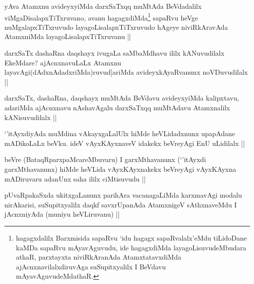 \begin{artha}
yAva Atamxnu avideyxyiMda darxSaTxqq muMtAda BeVdadalilx viMgaDisalapxTiTxruvano, avanu hagagxdiMda\footnote{hagagxdalilx Barxmisida sapaRvu `idu hagagx sapaRvalalx'eMdu tiLidoDane kaMDa sapaRvu mAyavAguvudu, ide hagagxdiMda layagoLisuvudeMbudara athaR, parxtayxta niviRkAranAda AtamxtatavxdiMda ajAcnxnavilalxdiruvAga suSupitxyalilx I BeVdavu mAyavAguvudeMdathaR.} sapaRvu heVge nuMgalapxTiTxruvudo layagoLisalapxTiTxruvudo hAgeye niviRkAravAda AtamxniMda layagoLisalapxTiTxruvanu ||
\end{artha}

\begin{artha}
darxSaTx dashaRna daqshayx ivugaLa saMbaMdhavu ililx kANuvudilalx EkeMdare? ajAcnxnavuLaLx Atamxnu layavAgi(dAdxnAdadxriMda)ruvud]ariMda avideyxkAyaRvanunx noVDuvudilalx ||
\end{artha}

\begin{artha}
darxSaTx, dashaRna, daqshayx muMtAda BeVdavu avideyxyiMda kalipxtavu, adariMda ajAcnxnavu nAshavAgalu darxSaTxqq muMtAdavu Atamxnalilx kANisuvudilalx ||
\end{artha}

\begin{artha}
`\stext'itAyxdiyAda muMdina vAkayxgaLalUlx hiMde heVLidadxnunx upapAdane mADikoLaLx beVku. ideV vAyxKAyxnaveV idakekx beVreyAgi EnU uLidilalx ||
\end{artha}



\begin{artha}
beVre (BataqRparxpaMcareMbuvaru) I garxMthavanunx (`\stext'itAyxdi garxMthavanunx) hiMde heVLida vAyxKAyxnakekx beVreyAgi vAyxKAyxna mADiruvaru adanUnx saha ililx ciMtisuvudu ||
\end{artha}


\begin{artha}
pUvaRpakaSxda ukitxgaLanunx parihAra vacanagaLiMda karxmavAgi modalu nirAkarisi, suSupitxyalilx daqkf savxrUpanAda AtamxnigeV sAthxnaveMdu I jAcnxniyAda (muniyu heVLiruvanu) ||
\end{artha}


